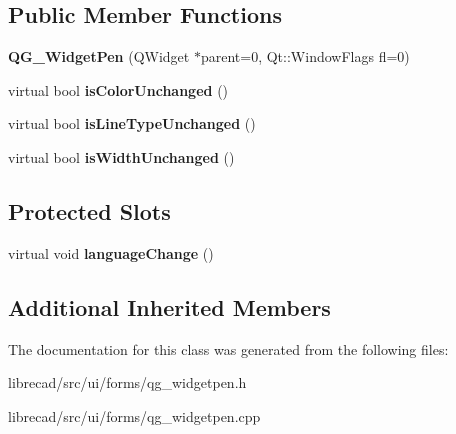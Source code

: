 \subsection*{Public Member Functions}
\begin{DoxyCompactItemize}
\item 
\hypertarget{classQG__WidgetPen_a161fb9f49045bd4782d6849ed19678f7}{{\bfseries Q\-G\-\_\-\-Widget\-Pen} (Q\-Widget $\ast$parent=0, Qt\-::\-Window\-Flags fl=0)}\label{classQG__WidgetPen_a161fb9f49045bd4782d6849ed19678f7}

\item 
\hypertarget{classQG__WidgetPen_a5de7142907b586f566ce47ec574b32da}{virtual bool {\bfseries is\-Color\-Unchanged} ()}\label{classQG__WidgetPen_a5de7142907b586f566ce47ec574b32da}

\item 
\hypertarget{classQG__WidgetPen_ac1722457584978d3a78245e5da7aba6f}{virtual bool {\bfseries is\-Line\-Type\-Unchanged} ()}\label{classQG__WidgetPen_ac1722457584978d3a78245e5da7aba6f}

\item 
\hypertarget{classQG__WidgetPen_a4cec40181d5ed53d868d5f99f0d61e4e}{virtual bool {\bfseries is\-Width\-Unchanged} ()}\label{classQG__WidgetPen_a4cec40181d5ed53d868d5f99f0d61e4e}

\end{DoxyCompactItemize}
\subsection*{Protected Slots}
\begin{DoxyCompactItemize}
\item 
\hypertarget{classQG__WidgetPen_a071fcdf68b3c59d11267d982129bc9a6}{virtual void {\bfseries language\-Change} ()}\label{classQG__WidgetPen_a071fcdf68b3c59d11267d982129bc9a6}

\end{DoxyCompactItemize}
\subsection*{Additional Inherited Members}


The documentation for this class was generated from the following files\-:\begin{DoxyCompactItemize}
\item 
librecad/src/ui/forms/qg\-\_\-widgetpen.\-h\item 
librecad/src/ui/forms/qg\-\_\-widgetpen.\-cpp\end{DoxyCompactItemize}
